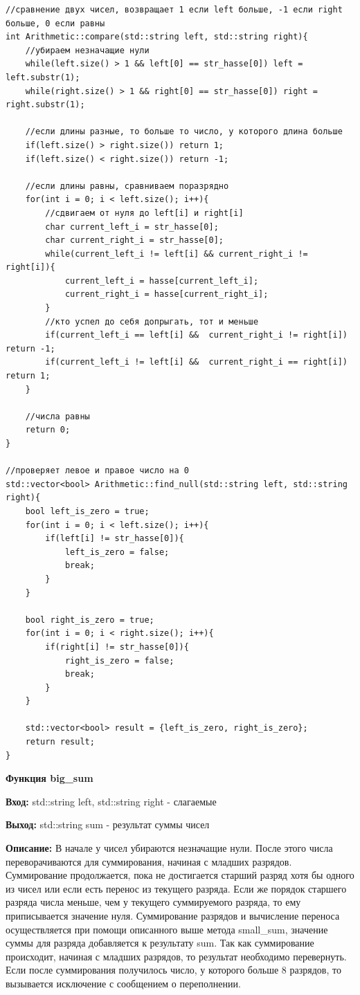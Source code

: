 \begin{lstlisting}[caption=compare и find\_null, label=lst:compare и find-null]
//сравнение двух чисел, возвращает 1 если left больше, -1 если right больше, 0 если равны
int Arithmetic::compare(std::string left, std::string right){
    //убираем незначащие нули
    while(left.size() > 1 && left[0] == str_hasse[0]) left = left.substr(1);
    while(right.size() > 1 && right[0] == str_hasse[0]) right = right.substr(1);

    //если длины разные, то больше то число, у которого длина больше
    if(left.size() > right.size()) return 1;
    if(left.size() < right.size()) return -1;

    //если длины равны, сравниваем поразрядно
    for(int i = 0; i < left.size(); i++){
        //сдвигаем от нуля до left[i] и right[i]
        char current_left_i = str_hasse[0];
        char current_right_i = str_hasse[0];
        while(current_left_i != left[i] && current_right_i != right[i]){
            current_left_i = hasse[current_left_i];
            current_right_i = hasse[current_right_i];
        }
        //кто успел до себя допрыгать, тот и меньше
        if(current_left_i == left[i] &&  current_right_i != right[i]) return -1;
        if(current_left_i != left[i] &&  current_right_i == right[i]) return 1;
    }

    //числа равны
    return 0;
}

//проверяет левое и правое число на 0
std::vector<bool> Arithmetic::find_null(std::string left, std::string right){
    bool left_is_zero = true;
    for(int i = 0; i < left.size(); i++){
        if(left[i] != str_hasse[0]){
            left_is_zero = false;
            break;
        }
    }

    bool right_is_zero = true;
    for(int i = 0; i < right.size(); i++){
        if(right[i] != str_hasse[0]){
            right_is_zero = false;
            break;
        }
    }

    std::vector<bool> result = {left_is_zero, right_is_zero};
    return result;
}
\end{lstlisting}

\textbf{Функция big\_sum } \par
\textbf{Вход:} std::string left, std::string right - слагаемые\par
\textbf{Выход:} std::string sum - результат суммы чисел\par
\textbf{Описание:} В начале у чисел убираются незначащие нули. После этого числа переворачиваются для суммирования, начиная с младших разрядов. Суммирование продолжается, пока не достигается старший разряд хотя бы одного из чисел или если есть перенос из текущего разряда. Если же порядок старшего разряда числа меньше, чем у текущего суммируемого разряда, то ему приписывается значение нуля. Суммирование разрядов и вычисление переноса осуществляется при помощи описанного выше метода small\_sum, значение суммы для разряда добавляется к результату sum. Так как суммирование происходит, начиная с младших разрядов, то результат необходимо перевернуть. Если после суммирования получилось число, у которого больше 8 разрядов, то вызывается исключение с сообщением о переполнении.\par
\vspace{10pt}

